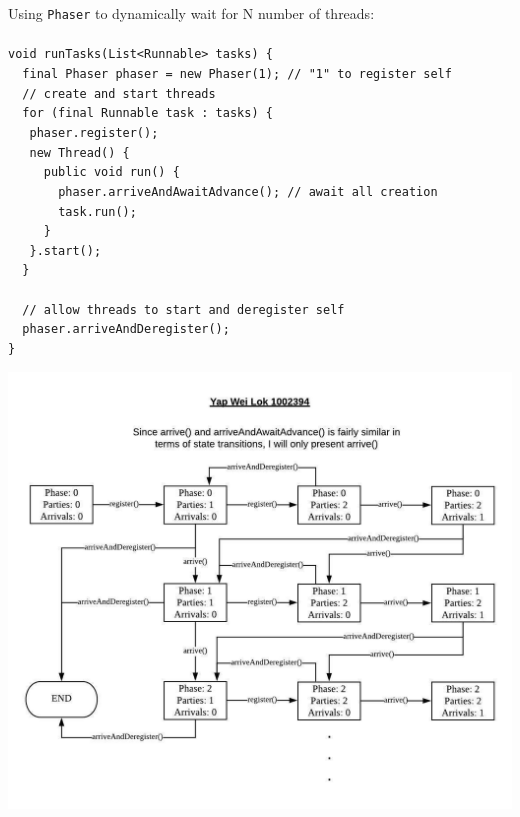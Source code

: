 \documentclass{article}
\begin{document}
Using \lstinline{Phaser} to dynamically wait for N number of threads:\\\\
\lstinline|void runTasks(List<Runnable> tasks) {|\\
\lstinline|  final Phaser phaser = new Phaser(1); // "1" to register self|\\
\lstinline|  // create and start threads|\\
\lstinline|  for (final Runnable task : tasks) {|\\
\lstinline|   phaser.register();|\\
\lstinline|   new Thread() {|\\
\lstinline|     public void run() {|\\
\lstinline|       phaser.arriveAndAwaitAdvance(); // await all creation|\\
\lstinline|       task.run();|\\
\lstinline|     }|\\
\lstinline|   }.start();|\\
\lstinline|  }|\\\\
\lstinline|  // allow threads to start and deregister self|\\
\lstinline|  phaser.arriveAndDeregister();|\\
\lstinline|}|
 
\begin{center}
\includegraphics[scale=0.8]{phaser.jpg}
\end{center}
\end{document}
